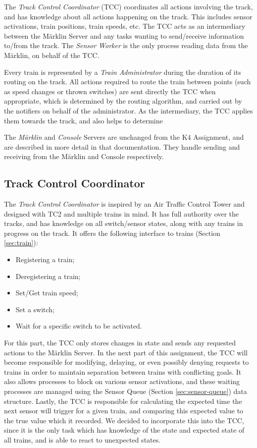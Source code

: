\documentclass[12pt, titlepage]{article}
\begin{document}
    The \emph{Track Control Coordinator} (TCC) coordinates all actions involving the track, and has knowledge about all actions happening on the track. This includes sensor activations, train positions, train speeds, etc. The TCC acts as an intermediary between the Märklin Server and any tasks wanting to send/receive information to/from the track. The \emph{Sensor Worker} is the only process reading data from the Märklin, on behalf of the TCC.
    
    Every train is represented by a \emph{Train Administrator} during the duration of its routing on the track. All actions required to route the train between points (such as speed changes or thrown switches) are sent directly the TCC when appropriate, which is determined by the routing algorithm, and carried out by the notifiers on behalf of the administrator. As the intermediary, the TCC applies them towards the track, and also helps to determine 

    The \emph{Märklin} and \emph{Console} Servers are unchanged from the K4 Assignment, and are described in more detail in that documentation. They handle sending and receiving from the Märklin and Console respectively. 
    
    \subsection{Track Control Coordinator}
    \label{sec:tcc}
    
    The \emph{Track Control Coordinator} is inspired by an Air Traffic Control Tower and designed with TC2 and multiple trains in mind. It has full authority over the tracks, and has knowledge on all switch/sensor states, along with any trains in progress on the track. It offers the following interface to trains (Section \ref{sec:train}):
    \begin{itemize}
        \item Registering a train;
        \item Deregistering a train;
        \item Set/Get train speed;
        \item Set a switch;
        \item Wait for a specific switch to be activated. 
    \end{itemize}
    
    For this part, the TCC only stores changes in state and sends any requested actions to the Märklin Server. In the next part of this assignment, the TCC will become responsible for modifying, delaying, or even possibly denying requests to trains in order to maintain separation between trains with conflicting goals. It also allows processes to block on various sensor activations, and these waiting processes are managed using the Sensor Queue (Section \ref{sec:sensor-queue}) data structure. Lastly, the TCC is responsible for calculating the expected time the next sensor will trigger for a given train, and comparing this expected value to the true value which it recorded. We decided to incorporate this into the TCC, since it is the only task which has knowledge of the state and expected state of all trains, and is able to react to unexpected states.
\end{document}
